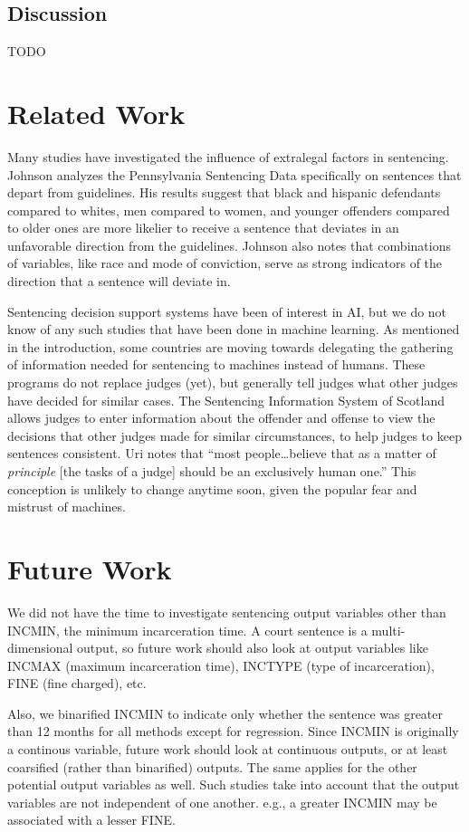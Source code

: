 \documentclass[11pt,letter]{article}
\begin{document}
\subsection{Discussion}
TODO

\section{Related Work}
Many studies have investigated the influence of extralegal factors in sentencing. Johnson analyzes the Pennsylvania Sentencing Data specifically on sentences that depart from guidelines. His results suggest that black and hispanic defendants compared to whites, men compared to women, and younger offenders compared to older ones are more likelier to receive a sentence that deviates in an unfavorable direction from the guidelines. Johnson also notes that combinations of variables, like race and mode of conviction, serve as strong indicators of the direction that a sentence will deviate in. 

Sentencing decision support systems have been of interest in AI, but we do not know of any such studies that have been done in machine learning. As mentioned in the introduction, some countries are moving towards delegating the gathering of information needed for sentencing to machines instead of humans. These programs do not replace judges (yet), but generally tell judges what other judges have decided for similar cases. 
The Sentencing Information System of Scotland allows judges to enter information about the offender and offense to view the decisions that other judges made for similar circumstances, to help judges to keep sentences consistent. Uri notes that ``most people\ldots believe that as a matter of \emph{principle} [the tasks of a judge] should be an exclusively human one.'' This conception is unlikely to change anytime soon, given the popular fear and mistrust of machines. 


\section{Future Work}
We did not have the time to investigate sentencing output variables other than INCMIN, the minimum incarceration time. A court sentence is a multi-dimensional output, so future work should also look at output variables like INCMAX (maximum incarceration time), INCTYPE (type of incarceration), FINE (fine charged), etc. 

Also, we binarified INCMIN to indicate only whether the sentence was greater than 12 months for all methods except for regression. Since INCMIN is originally a continous variable, future work should look at continuous outputs, or at least coarsified (rather than binarified) outputs. The same applies for the other potential output variables as well. Such studies take into account that the output variables are not independent of one another. e.g., a greater INCMIN may be associated with a lesser FINE. 
\end{document}
